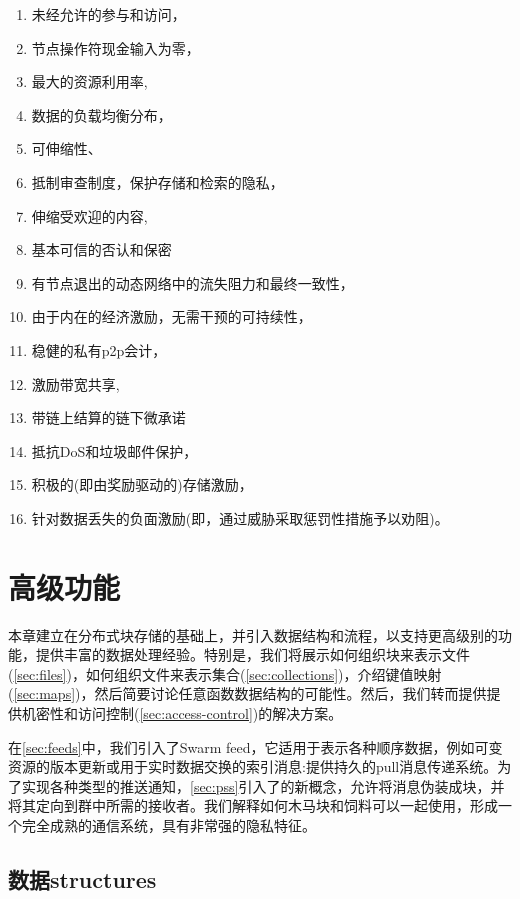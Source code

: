 \begin{enumerate}
    \item 未经允许的参与和访问，
    \item 节点操作符现金输入为零，
    \item 最大的资源利用率, 
    \item 数据的负载均衡分布，
    \item 可伸缩性、 
    \item 抵制审查制度，保护存储和检索的隐私，
    \item 伸缩受欢迎的内容,
    \item 基本可信的否认和保密
    \item 有节点退出的动态网络中的流失阻力和最终一致性，
    \item 由于内在的经济激励，无需干预的可持续性，
    \item 稳健的私有p2p会计， 
    \item 激励带宽共享,
    \item 带链上结算的链下微承诺
    \item 抵抗DoS和垃圾邮件保护，
    \item 积极的(即由奖励驱动的)存储激励，
    \item 针对数据丢失的负面激励(即，通过威胁采取惩罚性措施予以劝阻)。
\end{enumerate}


\chapter{高级功能}\label{sec:high-level-functionality}


本章建立在分布式块存储的基础上，并引入数据结构和流程，以支持更高级别的功能，提供丰富的数据处理经验。特别是，我们将展示如何组织块来表示文件(\ref{sec:files})，如何组织文件来表示集合(\ref{sec:collections})，介绍键值映射(\ref{sec:maps})，然后简要讨论任意函数数据结构的可能性。然后，我们转而提供提供机密性和访问控制(\ref{sec:access-control})的解决方案。

在\ref{sec:feeds}中，我们引入了Swarm feed，它适用于表示各种顺序数据，例如可变资源的版本更新或用于实时数据交换的索引消息:提供持久的pull消息传递系统。为了实现各种类型的推送通知，\ref{sec:pss}引入了的新概念，允许将消息伪装成块，并将其定向到群中所需的接收者。我们解释如何木马块和饲料可以一起使用，形成一个完全成熟的通信系统，具有非常强的隐私特征。                                                       

\section{数据structures\statusgreen}\label{sec:datastructures}

